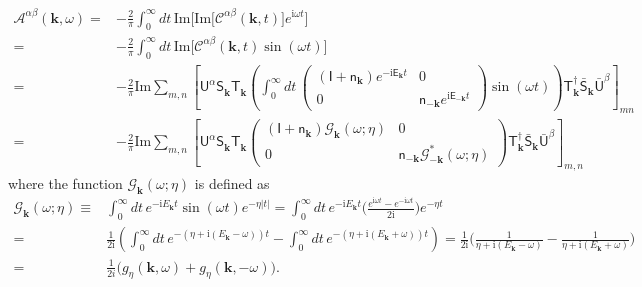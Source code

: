 \documentclass[aps, prx, nofootinbib, superscriptaddress]{revtex4-2}
\newcommand{\kvec}{\mathbf{k}}
\newcommand{\ri}{\mathrm{i}}
\begin{document}
\begin{equation}
    \begin{split}
        \mathcal{A}^{\alpha\beta}(\kvec, \omega) 
        = & - \frac{2}{\pi} \int_{0}^{\infty} dt \, \mathrm{Im} \big[ \mathrm{Im} \big[ \mathcal{C}^{\alpha\beta}(\kvec, t) \big] e^{\ri \omega t} \big] \\
        = & - \frac{2}{\pi} \int_{0}^{\infty} dt \, \mathrm{Im} \big[ \mathcal{C}^{\alpha\beta}(\kvec, t) \sin (\omega t) \big] \\
        = & - \frac{2}{\pi} \mathrm{Im} 
        \sum_{m,n}
        \left[ 
        \mathsf{U}^{\alpha} \mathsf{S}_{\kvec}^{\phantom \dagger} \mathsf{T}_{\kvec}^{\phantom \dagger}
        \left( \int_{0}^{\infty} dt \, 
        \begin{pmatrix}
            (\mathsf{I} + \mathsf{n}_{\kvec}) e^{- \ri \mathsf{E}_{\kvec} t} & 0 \\
            0 & \mathsf{n}_{-\kvec} e^{\ri \mathsf{E}_{-\kvec} t}
        \end{pmatrix}
        \sin (\omega t)
        \right)
        \mathsf{T}^{\dagger}_{\kvec} \bar{\mathsf{S}}_{\kvec}^{\phantom \dagger} \bar{\mathsf{U}}^{\beta}
        \right]_{mn} \\
        = & -  \frac{2}{\pi} \mathrm{Im} 
        \sum_{m,n}
        \left[ 
            \mathsf{U}^{\alpha} \mathsf{S}_{\kvec}^{\phantom \dagger} \mathsf{T}_{\kvec}^{\phantom \dagger}
            \begin{pmatrix}
                (\mathsf{I + n}_{  \kvec}) \mathcal{G}_{\kvec} (\omega ; \eta) & 0 \\
                0 &  \mathsf{n}_{- \kvec} \mathcal{G}_{-\kvec}^{*} (\omega ; \eta)
            \end{pmatrix}
            \mathsf{T}^{\dagger}_{\kvec} \bar{\mathsf{S}}_{\kvec}^{\phantom \dagger}
            \bar{\mathsf{U}}^{\beta}
        \right]_{m,n}
    \end{split}
\end{equation}
where the function $\mathcal{G}_{\kvec}(\omega ; \eta)$ is defined as 
\begin{align*}
     \mathcal{G}_{\kvec}(\omega ; \eta)
     \equiv & \int_{0}^{\infty} dt \,  e^{- \ri E_{\kvec} t} \sin (\omega t) e^{-\eta |t|} 
     = \int_{0}^{\infty} dt \,  e^{-\ri E_{\kvec} t} \bigg( \frac{e^{\ri \omega t} - e^{- \ri \omega t}}{2\ri} \bigg) e^{-\eta t} \\
     = & \frac{1}{2 \ri} 
     \left( 
     \int_{0}^{\infty} dt \,
     e^{-(\eta + \ri(E_{\kvec} - \omega))t} - \int_{0}^{\infty} dt \, e^{-(\eta + \ri(E_{\kvec} + \omega))t} 
     \right) 
     = \frac{1}{2 \ri} \Big( \frac{1}{\eta + \ri(E_{\kvec} - \omega)} - \frac{1}{\eta + \ri(E_{\kvec} + \omega)} \Big) \\
     = & \frac{1}{2i} \big( g_{\eta}(\kvec, \omega) + g_{\eta} (\kvec, - \omega) \big).
\end{align*}
\end{document}
